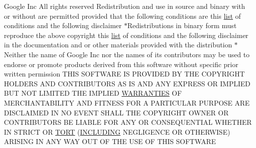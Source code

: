 \begin{DoxyCompactItemize}
\item 
Google Inc All rights reserved Redistribution and use in source and binary with or without are permitted provided that the following conditions are this \hyperlink{CMakeLists_8txt_a548e427ae9357a6f3536cff3ca23efda}{list} of conditions and the following disclaimer $\ast$Redistributions in binary form must reproduce the above copyright this \hyperlink{CMakeLists_8txt_a548e427ae9357a6f3536cff3ca23efda}{list} of conditions and the following disclaimer in the documentation and or other materials provided with the distribution $\ast$Neither the name of Google Inc nor the names of its contributors may be used to endorse or promote products derived from this software without specific prior written permission T\+H\+IS S\+O\+F\+T\+W\+A\+RE IS P\+R\+O\+V\+I\+D\+ED BY T\+HE C\+O\+P\+Y\+R\+I\+G\+HT H\+O\+L\+D\+E\+RS A\+ND C\+O\+N\+T\+R\+I\+B\+U\+T\+O\+RS AS IS A\+ND A\+NY E\+X\+P\+R\+E\+SS OR I\+M\+P\+L\+I\+ED B\+UT N\+OT L\+I\+M\+I\+T\+ED T\+HE I\+M\+P\+L\+I\+ED \hyperlink{COPYING_8txt_ac62ff2f8b2f565a26b35ecca12f17f4a}{W\+A\+R\+R\+A\+N\+T\+I\+ES} OF M\+E\+R\+C\+H\+A\+N\+T\+A\+B\+I\+L\+I\+TY A\+ND F\+I\+T\+N\+E\+SS F\+OR A P\+A\+R\+T\+I\+C\+U\+L\+AR P\+U\+R\+P\+O\+SE A\+RE D\+I\+S\+C\+L\+A\+I\+M\+ED IN NO E\+V\+E\+NT S\+H\+A\+LL T\+HE C\+O\+P\+Y\+R\+I\+G\+HT O\+W\+N\+ER OR C\+O\+N\+T\+R\+I\+B\+U\+T\+O\+RS BE L\+I\+A\+B\+LE F\+OR A\+NY OR C\+O\+N\+S\+E\+Q\+U\+E\+N\+T\+I\+AL W\+H\+E\+T\+H\+ER IN S\+T\+R\+I\+CT OR \hyperlink{COPYING_8txt_a7ec57b36912886fa2fc6acd1304c5f27}{T\+O\+RT} (\hyperlink{COPYING_8txt_ab1928ef22d7c2011aca3b1e59ca80596}{I\+N\+C\+L\+U\+D\+I\+NG} N\+E\+G\+L\+I\+G\+E\+N\+CE OR O\+T\+H\+E\+R\+W\+I\+SE) A\+R\+I\+S\+I\+NG IN A\+NY W\+AY O\+UT OF T\+HE U\+SE OF T\+H\+IS S\+O\+F\+T\+W\+A\+RE
\end{DoxyCompactItemize}
